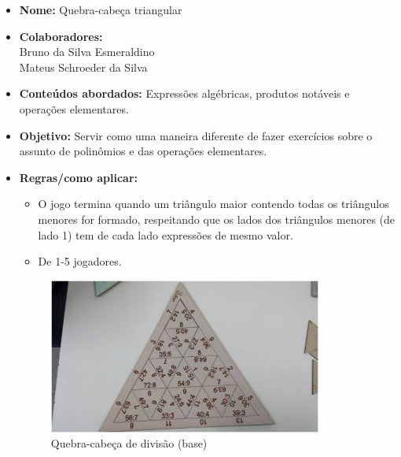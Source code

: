 \documentclass[english,ngerman,parskip=half]{scrartcl}
\begin{document}
\begin{itemize}

    \item \textbf{Nome:} Quebra-cabeça triangular
    \item \textbf{Colaboradores:}\\
        Bruno da Silva Esmeraldino
        \\
        Mateus Schroeder da Silva
    \item \textbf{Conteúdos abordados:} Expressões algébricas, produtos notáveis e operações elementares.
    \item \textbf{Objetivo:} Servir como uma maneira diferente de fazer exercícios sobre o assunto de polinômios e das operações elementares.
    \item \textbf{Regras/como aplicar:} 
            \begin{itemize}
                \item O jogo termina quando um triângulo maior contendo todas os triângulos menores for formado, respeitando que os lados dos triângulos menores (de lado 1) tem de cada lado expressões de mesmo valor.
                \item De 1-5 jogadores.
            \end{itemize}

        \begin{figure}[ht!]
            \centering
            \includegraphics[width=90mm]{./images/qc-comprado.png}
            \caption{Quebra-cabeça de divisão (base)\label{Quebra-cabeça de divisão}}
        \end{figure}


\end{itemize}
\end{document}
